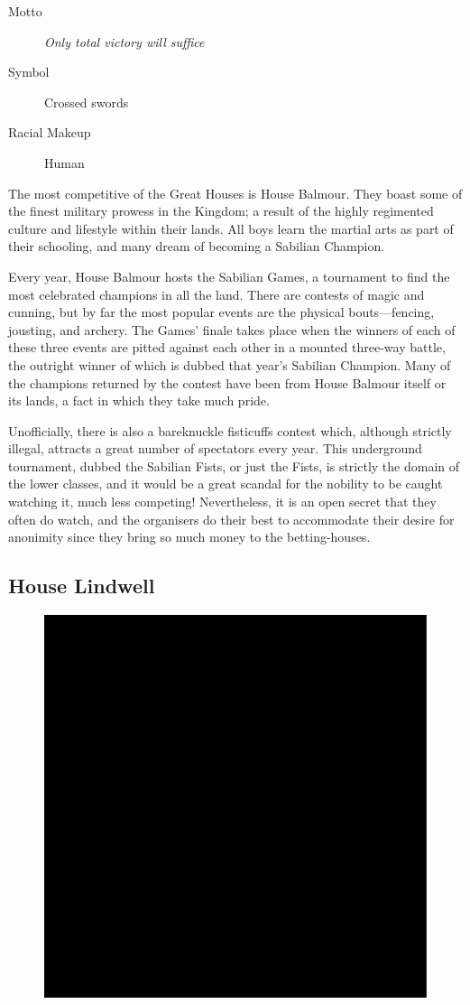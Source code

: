 \documentclass[10pt,twoside,openright,a4paper,twocolumn]{book}
\begin{document}
\begin{description}
\item[Motto] \textit{Only total victory will suffice}

\item[Symbol] Crossed swords

\item[Racial Makeup] Human
\end{description}

\noindent
The most competitive of the Great Houses is House Balmour.  They boast
some of the finest military prowess in the Kingdom; a result of the highly
regimented culture and lifestyle within their lands.  All boys learn the martial
arts as part of their schooling, and many dream of becoming a Sabilian
Champion.

Every year, House Balmour hosts the Sabilian Games, a tournament to find
the most celebrated champions in all the land.  There are contests of magic
and cunning, but by far the most popular events are the physical bouts---fencing,
jousting, and archery.  The Games' finale takes place when the winners
of each of these three events are pitted against each other in a mounted
three-way battle, the outright winner of which is dubbed that year's Sabilian
Champion.  Many of the champions returned by the contest have been from
House Balmour itself or its lands, a fact in which they take much pride.

Unofficially, there is also a bareknuckle fisticuffs contest which, although
strictly illegal, attracts a great number of spectators every year.  This underground
tournament, dubbed the Sabilian Fists, or just the Fists, is strictly the domain
of the lower classes, and it would be a great scandal for the nobility to be caught
watching it, much less competing!  Nevertheless, it is an open secret that they
often do watch, and the organisers do their best to accommodate their desire for
anonimity since they bring so much money to the betting-houses.

\subsection*{House Lindwell}

\begin{figure}
  \includegraphics[width=0.48\columnwidth]{images/HouseLindwell}
\end{figure}
\end{document}
